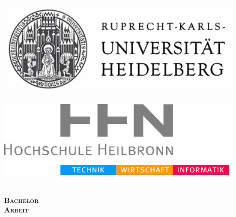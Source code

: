 
\begin{center}
\hfill
\begin{minipage}{0.45\textwidth}
\begin{flushleft}
\includegraphics[width=0.9\textwidth]{00_title/pics/UniHD} \\
\end{flushleft}
\end{minipage}
\hfill
\begin{minipage}{0.45\textwidth}
\begin{flushright}
\includegraphics[width=0.9\textwidth]{00_title/pics/HHN} \\
\end{flushright}
\end{minipage}
\hfill \\[3.0cm]

\textsc{\huge \bfseries Bachelor}\\[1.0cm]
\textsc{\huge \bfseries Arbeit}\\[3.0cm]

{ \Large \bfseries \titel}\\[5.5cm]


\end{center}
